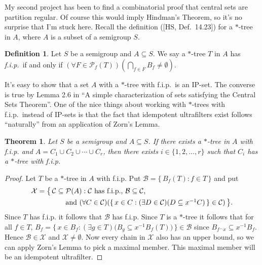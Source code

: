 \documentclass[12pt]{letter}
\theoremstyle{plain}
\newtheorem*{thm}{Theorem}
\theoremstyle{definition}
\newtheorem*{defn}{Definition}
\newcommand{\calB}{\mathcal{B}}
\newcommand{\calC}{\mathcal{C}}
\newcommand{\calX}{\mathcal{X}}
\newcommand{\calP}{\mathcal{P}}
\newcommand{\Pf}{\mathcal{P}_f}
\begin{document}
\begin{letter}{}
My second project has been to find a combinatorial proof that central
sets are partition regular. 
Of course this would imply Hindman's Theorem, so it's no surprise that
I'm stuck here. 
Recall the definition ([HS, Def.~14.23]) for a \mbox{$*$-tree} in $A$,
where $A$ is a subset of a semigroup $S$.

\begin{defn}
  Let $S$ be a semigroup and $A \subseteq S$.
  We say a \mbox{$*$-tree} $T$ in $A$ has \textsl{f.i.p.}~if and only if
  $(\forall F \in \Pf(T))(\bigcap_{f \in F} B_f \ne \emptyset)$.
\end{defn}

It's easy to show that a set $A$ with a \mbox{$*$-tree} with f.i.p.~is
an IP-set. 
The converse is true by Lemma 2.6 in ``A simple characterization of
sets satisfying the Central Sets Theorem''. 
One of the nice things about working with \mbox{$*$-trees} with
f.i.p.~instead of IP-sets is that the fact that idempotent
ultrafilters exist follows ``naturally'' from an application of Zorn's
Lemma.

\begin{thm}
  Let $S$ be a semigroup and $A \subseteq S$.
  If there exists a \mbox{$*$-tree} in $A$ with f.i.p. and $A = C_1
  \cup C_2 \cup \cdots \cup C_r$, then there exists $i \in \{1, 2,
  \ldots, r\}$ such that $C_i$ has a \mbox{$*$-tree} with f.i.p.
\end{thm}
\begin{proof}
  Let $T$ be a \mbox{$*$-tree} in $A$ with f.i.p.
  Put $\calB = \{\, B_f(T) : f \in T \,\}$ and put 
  \begin{align*}
      \cal{X} &= \bigl\{\, \calC \subseteq \calP(A) : \mbox{$\calC$ has
      f.i.p., $\calB \subseteq \calC$,} \\
    &\hspace{4em}\mbox{and $(\forall C \in
      \calC)(\{\, x \in C: (\exists D \in \calC)(D \subseteq x^{-1}C)
      \,\} \in \calC)$} \,\bigr\}.
  \end{align*}
  Since $T$ has f.i.p. it follows that $\calB$ has f.i.p.
  Since $T$ is a \mbox{$*$-tree} it follows that for all $f \in T$, 
  $B_f = \{\, x \in B_f : \mbox{$(\exists g \in T)\bigr(B_g \subseteq
    x^{-1}B_f(T)\bigl)$} \,\} \in \calB$ since $B_{f^\frown x} \subseteq
  x^{-1}B_f$. 
  Hence $\calB \in \calX$ and $\calX \ne \emptyset$. 
  Now every chain in $\calX$ also has an upper bound, so we can apply
  Zorn's Lemma to pick a maximal member.
  This maximal member will be an idempotent ultrafilter.
\end{proof}


\end{letter}
\end{document}
